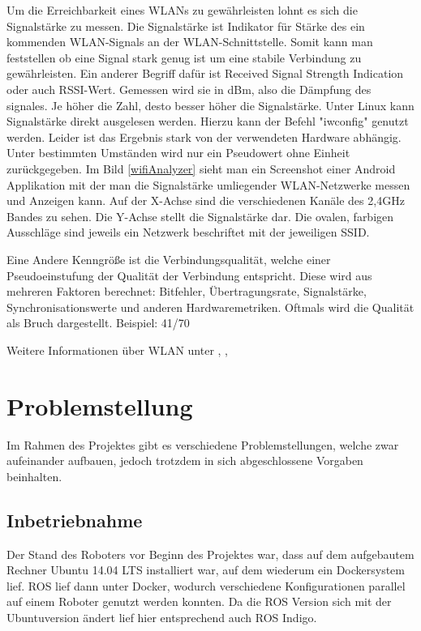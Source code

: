 \documentclass{scrartcl}%
\begin{document}
Um die Erreichbarkeit eines WLANs zu gewährleisten lohnt es sich die Signalstärke zu messen. Die Signalstärke ist Indikator für Stärke des ein kommenden WLAN-Signals an der WLAN-Schnittstelle. Somit kann man feststellen ob eine Signal stark genug ist um eine stabile Verbindung zu gewährleisten. Ein anderer Begriff dafür ist  Received Signal Strength Indication oder auch RSSI-Wert. Gemessen wird sie in dBm, also die Dämpfung des signales. Je höher die Zahl, desto besser höher die Signalstärke. Unter Linux kann Signalstärke direkt  ausgelesen werden. Hierzu kann der Befehl "iwconfig" genutzt werden. Leider ist das Ergebnis stark von der verwendeten Hardware abhängig. Unter bestimmten Umständen wird nur ein Pseudowert ohne Einheit zurückgegeben.
Im Bild \ref{wifiAnalyzer} sieht man ein Screenshot einer Android Applikation mit der man die Signalstärke umliegender WLAN-Netzwerke messen und Anzeigen kann. Auf der X-Achse sind die verschiedenen Kanäle des 2,4GHz Bandes zu sehen. Die Y-Achse stellt die Signalstärke dar. Die ovalen, farbigen Ausschläge sind jeweils ein Netzwerk beschriftet mit der jeweiligen SSID.

Eine Andere Kenngröße ist die Verbindungsqualität, welche einer Pseudoeinstufung der Qualität der Verbindung entspricht. Diese wird aus mehreren Faktoren berechnet: Bitfehler, Übertragungsrate, Signalstärke, Synchronisationswerte und anderen Hardwaremetriken. Oftmals wird die Qualität als Bruch dargestellt. Beispiel: 41/70


Weitere Informationen über WLAN unter \cite{elektronikKompWlan}, \cite{elektronikKompWlanFreq}, \cite{heiseWlan}


\newpage
\section{Problemstellung}
Im Rahmen des Projektes gibt es verschiedene Problemstellungen, welche zwar aufeinander aufbauen, jedoch trotzdem in sich abgeschlossene Vorgaben beinhalten.

\subsection{Inbetriebnahme}
Der Stand des Roboters vor Beginn des Projektes war, dass auf dem aufgebautem Rechner Ubuntu 14.04 LTS installiert war, auf dem wiederum ein Dockersystem lief. ROS lief dann unter Docker, wodurch verschiedene Konfigurationen parallel auf einem Roboter genutzt werden konnten. Da die ROS Version sich mit der Ubuntuversion ändert lief hier entsprechend auch ROS Indigo.
\end{document}
